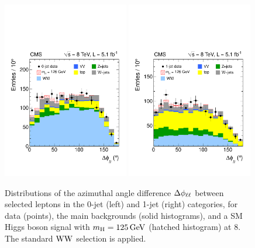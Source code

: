 \documentclass[11pt,twoside,a4paper,cmspaper,final,collab]{cms-tdr}
\begin{document}
\begin{figure}[h!t]
\begin{center}
   \includegraphics[width=0.49\textwidth]{figures/hww_wwpresel_0j_mh125_deltaphill.pdf}
   \includegraphics[width=0.49\textwidth]{figures/hww_wwpresel_1j_mh125_deltaphill.pdf}
	 \caption{Distributions of the azimuthal angle difference $\Delta\phi_{\ell\ell}$ between selected
leptons in the 0-jet (left) and 1-jet (right) categories, for data (points),
the main backgrounds (solid histograms), and a SM Higgs boson signal with $m_{\mathrm{H}}= 125\,\text{Ge\hspace{-.08em}V}$
(hatched histogram) at 8\TeV. The standard $\mathrm{W}\mathrm{W}$
selection is applied.} \label{fig:wwpresel_nj_mh125_deltaphill}
\end{center}
\end{figure}
\end{document}
